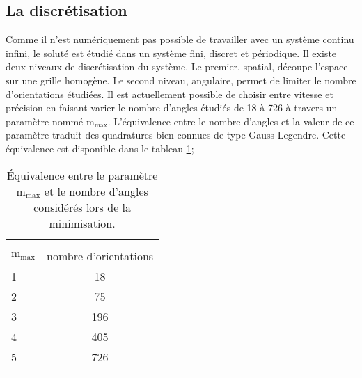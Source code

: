 \subsection{La discrétisation}
Comme il n'est numériquement pas possible de travailler avec un système continu infini, le soluté est étudié dans un système fini, discret et périodique. Il existe deux niveaux de discrétisation du système. Le premier, spatial, découpe l'espace sur une grille homogène. Le second niveau, angulaire\cite{ding_cea-01564512}, permet de limiter le nombre d'orientations étudiées. Il est actuellement possible de choisir entre vitesse et précision en faisant varier le nombre d'angles étudiés de 18 à 726 à travers un paramètre nommé $\mathrm{m}_\mathrm{max}$. L'équivalence entre le nombre d'angles et la valeur de ce paramètre traduit des quadratures bien connues de type Gauss-Legendre\cite{abbott_tricks_2005}. Cette équivalence est disponible dans le tableau \ref{tab:mmax};

\begin{table}[ht]
 \centering
  \begin{tabular}{l | c}
    \hline \multicolumn{2}{c}{} \\[-1em]\hline
    $\mathrm{m}_\mathrm{max}$ & nombre d'orientations \\
    \hline
    1  & 18 \\
    2  & 75 \\
    3  & 196 \\
    4  & 405 \\
    5  & 726 \\
    \hline \multicolumn{2}{c}{} \\[-1em]\hline
  \end{tabular}
  \caption[\'Equivalence entre le paramètre $\mathrm{m}_\mathrm{max}$ et le nombre d'angles.]{\'Equivalence entre le paramètre $\mathrm{m}_\mathrm{max}$ et le nombre d'angles considérés lors de la minimisation.}
  \label{tab:mmax}  
\end{table}


